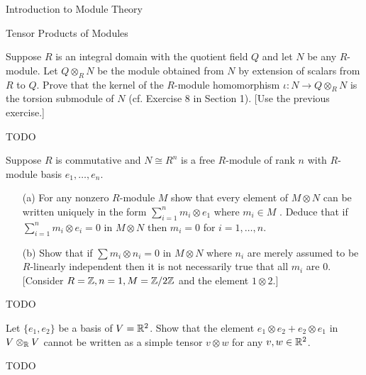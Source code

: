 \begin{chapter}{Introduction to Module Theory}
\begin{section}{Tensor Products of Modules}
\begin{solution}
\end{solution}\oneperpage



\begin{problem}\label{ex:10.4.9}
Suppose $R$ is an integral domain with the quotient field $Q$ and let $N$ be any $R$-module. Let $Q\otimes_RN$ be the module obtained from $N$ by extension of scalars from $R$ to $Q$. Prove that the kernel of the $R$-module homomorphism $\iota:N\to Q\otimes_RN$ is the torsion submodule of $N$ (cf. Exercise 8 in Section 1).  [Use the previous exercise.] 
\end{problem}
\begin{solution}TODO

\end{solution}\oneperpage



\begin{problem}\label{ex:10.4.10}
Suppose $R$ is commutative and $N\cong R^n$ is a free $R$-module of rank $n$ with $R$-module basis $e_1,\ldots,e_n$. \begin{enumerate}
\item[(a)] For any nonzero $R$-module $M$ show that every element of $M\otimes N$ can be written uniquely in the form $\sum_{i=1}^nm_i\otimes e_1$ where $m_i\in M$ . Deduce that if $\sum_{i=1}^n m_i\otimes e_i = 0$ in $M\otimes N$ then $m_i=0$ for $i=1,\ldots,n$. 
\item[(b)] Show that if $\sum m_i\otimes n_i = 0$ in $M\otimes N$ where $n_i$ are merely assumed to be $R$-linearly independent then it is not necessarily true that all $m_i$ are 0. [Consider $R=\mathbb{Z},n=1,M=\mathbb{Z}/2\mathbb{Z}$ and the element $1\otimes 2$.]
\end{enumerate}
\end{problem}
\begin{solution}TODO

\end{solution}\oneperpage



\begin{problem}\label{ex:10.4.11}
Let $\{e_1,e_2\}$ be a basis of $V=\mathbb{R}^2$. Show that the element $e_1\otimes e_2 + e_2\otimes e_1$ in $V\otimes_{\mathbb{R}} V$ cannot be written as a simple tensor $v\otimes w$ for any $v,w\in \mathbb{R}^2$. 
\end{problem}
\begin{solution}TODO

\end{solution}\oneperpage




\end{section}
\end{chapter}
